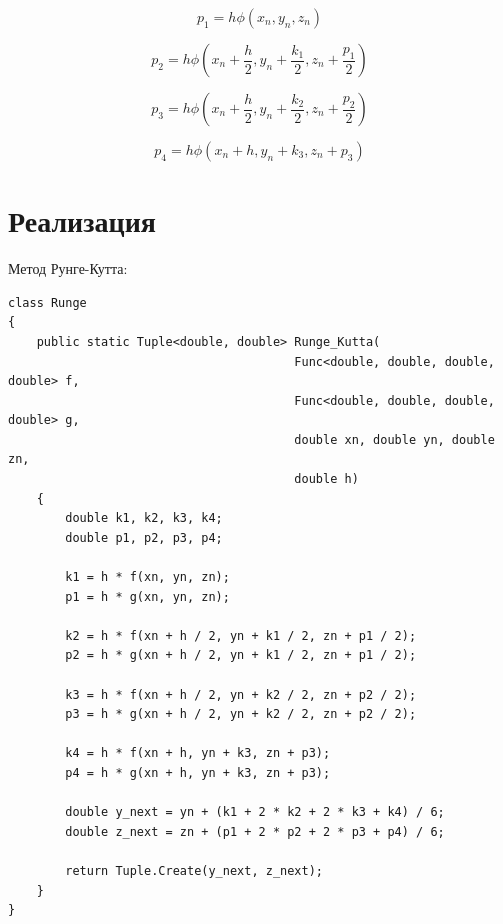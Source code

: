 \documentclass[a4paper,oneside,12pt]{extreport}
\begin{document}
\begin{equation*}
    p_1 = h\phi(x_n,y_n,z_n)
\end{equation*}

\begin{equation*}
    p_2 = h\phi(x_n + \frac{h}{2},y_n+\frac{k_1}{2},z_n+\frac{p_1}{2})
\end{equation*}

\begin{equation*}
    p_3 = h\phi(x_n + \frac{h}{2},y_n+\frac{k_2}{2},z_n+\frac{p_2}{2})
\end{equation*}

\begin{equation*}
    p_4 = h\phi(x_n + h,y_n+k_3,z_n+p_3)
\end{equation*}

\newpage 
\section{Реализация}

Метод Рунге-Кутта:
\begin{lstlisting}
class Runge
{
    public static Tuple<double, double> Runge_Kutta(
                                        Func<double, double, double, double> f,
                                        Func<double, double, double, double> g,
                                        double xn, double yn, double zn,
                                        double h)
    {
        double k1, k2, k3, k4;
        double p1, p2, p3, p4;

        k1 = h * f(xn, yn, zn);
        p1 = h * g(xn, yn, zn);

        k2 = h * f(xn + h / 2, yn + k1 / 2, zn + p1 / 2);
        p2 = h * g(xn + h / 2, yn + k1 / 2, zn + p1 / 2);

        k3 = h * f(xn + h / 2, yn + k2 / 2, zn + p2 / 2);
        p3 = h * g(xn + h / 2, yn + k2 / 2, zn + p2 / 2);

        k4 = h * f(xn + h, yn + k3, zn + p3);
        p4 = h * g(xn + h, yn + k3, zn + p3);

        double y_next = yn + (k1 + 2 * k2 + 2 * k3 + k4) / 6;
        double z_next = zn + (p1 + 2 * p2 + 2 * p3 + p4) / 6;

        return Tuple.Create(y_next, z_next);
    }
}
\end{lstlisting}
\end{document}
